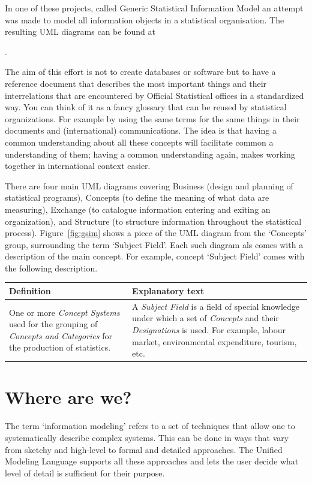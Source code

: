 In one of these projects, called Generic Statistical Information Model
an attempt was made to model all information objects in a statistical
organisation. The resulting UML diagrams can be found at
\begin{center}
\href{https://statswiki.unece.org/display/gsim/}{}.
\end{center}
The aim of this effort is not to create databases or software but to have a
reference document that describes the most important things and their
interrelations that are encountered by Official Statistical offices in a
standardized way.  You can think of it as a fancy glossary that can be reused
by statistical organizations. For example by using the same terms for the same
things in their documents and (international) communications. The idea is that
having a common understanding about all these concepts will facilitate common a
understanding of them; having a common understanding again, makes working
together in international context easier.


There are four main UML diagrams covering Business (design and planning of
statistical programs), Concepts (to define the meaning of what data are
measuring), Exchange (to catalogue information entering and exiting an
organization), and Structure (to structure information throughout the
statistical process). Figure~\ref{fig:gsim} shows a piece of the UML diagram
from the `Concepts' group, surrounding the term `Subject Field'. Each such diagram
als comes with a description of the main concept. For example, concept `Subject Field'
comes with the following description.
\begin{center}
\begin{tabular}{|p{}|p{}|}
\hline
\textbf{Definition} & \textbf{Explanatory text}\\
\hline
One or more \emph{Concept Systems} used for the grouping of \emph{Concepts and
Categories} for the production of statistics.
&
A \emph{Subject Field} is a field of special knowledge under which a set of
\emph{Concepts} and their \emph{Designations} is used. For example, labour
market, environmental expenditure, tourism, etc.\\
\hline
\end{tabular}
\end{center}


\section*{Where are we?}
The term `information modeling' refers to a set of techniques that allow one to
systematically describe complex systems. This can be done in ways that vary
from sketchy and high-level to formal and detailed approaches.  The Unified
Modeling Language supports all these approaches and lets the user decide what
level of detail is sufficient for their purpose.

